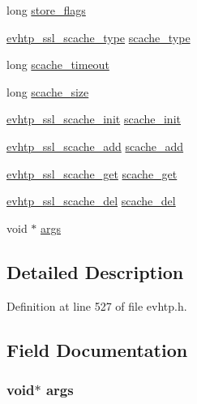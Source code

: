 \begin{DoxyCompactItemize}
\item 
long \hyperlink{structevhtp__ssl__cfg__s_ad15d9e1280fb922732799e92fa24ba2a}{store\-\_\-flags}
\item 
\hyperlink{evhtp_8h_ab478739101b89e04a6583b835033f998}{evhtp\-\_\-ssl\-\_\-scache\-\_\-type} \hyperlink{structevhtp__ssl__cfg__s_ae30daad1d680d19dc75f4c29e56b3430}{scache\-\_\-type}
\item 
long \hyperlink{structevhtp__ssl__cfg__s_a32dceaa2f20a1c9f617b4025845feff8}{scache\-\_\-timeout}
\item 
long \hyperlink{structevhtp__ssl__cfg__s_ae2e14ee7309cb5910c05d6a728fa276c}{scache\-\_\-size}
\item 
\hyperlink{evhtp_8h_aeb11b64dcc14aafb4a512331ea6d87c8}{evhtp\-\_\-ssl\-\_\-scache\-\_\-init} \hyperlink{structevhtp__ssl__cfg__s_a9a8bc5976342f1f9f6670df6aa2421d2}{scache\-\_\-init}
\item 
\hyperlink{evhtp_8h_a50280284cbe875345c8589aa49c3d03e}{evhtp\-\_\-ssl\-\_\-scache\-\_\-add} \hyperlink{structevhtp__ssl__cfg__s_a3b1adda2604e2f06fcf871690d83316b}{scache\-\_\-add}
\item 
\hyperlink{evhtp_8h_a4bcad48932b155622f1b24e7ee061ec9}{evhtp\-\_\-ssl\-\_\-scache\-\_\-get} \hyperlink{structevhtp__ssl__cfg__s_aaaec9de37c98a03578c9a6c20de897ad}{scache\-\_\-get}
\item 
\hyperlink{evhtp_8h_a146f92a29f94320073760caa25aab507}{evhtp\-\_\-ssl\-\_\-scache\-\_\-del} \hyperlink{structevhtp__ssl__cfg__s_a040f341668db7112bb0bec3fa2ee3828}{scache\-\_\-del}
\item 
void $\ast$ \hyperlink{structevhtp__ssl__cfg__s_add0eb34e0cef9e763462cf9080f9be0a}{args}
\end{DoxyCompactItemize}


\subsection{Detailed Description}


Definition at line 527 of file evhtp.\-h.



\subsection{Field Documentation}
\hypertarget{structevhtp__ssl__cfg__s_add0eb34e0cef9e763462cf9080f9be0a}{
\subsubsection[{args}]{\setlength{\rightskip}{0pt plus 5cm}void$\ast$ args}}\label{structevhtp__ssl__cfg__s_add0eb34e0cef9e763462cf9080f9be0a}


